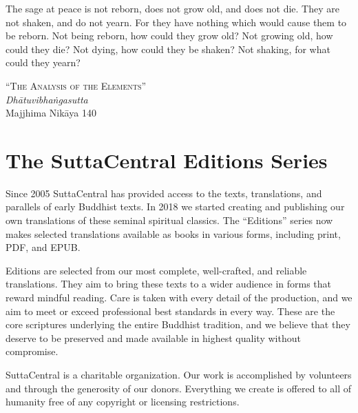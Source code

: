 \documentclass[12pt,openany]{book}%
\newcommand{\blankpage}{
\newpage
\thispagestyle{empty}
\mbox{}
\newpage
}
\newcommand*{\epigraphTranslatedTitle}[1]{\vspace*{.5em}\footnotesize\textsc{#1}\\}%
\newcommand*{\epigraphRootTitle}[1]{\footnotesize\textit{#1}\\}%
\newcommand*{\epigraphReference}[1]{\footnotesize{#1}}%
\begin{document}
\newpage

\setlength{\parindent}{1.5em}%
\newpage

\vspace*{\fill}

\begin{center}
\epigraph{The sage at peace is not reborn, does not grow old, and does not die. They are not shaken, and do not yearn. For they have nothing which would cause them to be reborn. Not being reborn, how could they grow old? Not growing old, how could they die? Not dying, how could they be shaken? Not shaking, for what could they yearn?}
{
\epigraphTranslatedTitle{“The Analysis of the Elements”}
\epigraphRootTitle{\textsanskrit{Dhātuvibhaṅgasutta}}
\epigraphReference{Majjhima \textsanskrit{Nikāya} 140}
}
\end{center}

\vspace*{2in}

\vspace*{\fill}

\blankpage%

\setlength{\parindent}{1em}
%
\tableofcontents
\newpage
\pagestyle{fancy}
%
\chapter*{The SuttaCentral Editions Series}

Since 2005 SuttaCentral has provided access to the texts, translations, and parallels of early Buddhist texts. In 2018 we started creating and publishing our own translations of these seminal spiritual classics. The “Editions” series now makes selected translations available as books in various forms, including print, PDF, and EPUB.

Editions are selected from our most complete, well-crafted, and reliable translations. They aim to bring these texts to a wider audience in forms that reward mindful reading. Care is taken with every detail of the production, and we aim to meet or exceed professional best standards in every way. These are the core scriptures underlying the entire Buddhist tradition, and we believe that they deserve to be preserved and made available in highest quality without compromise.

SuttaCentral is a charitable organization. Our work is accomplished by volunteers and through the generosity of our donors. Everything we create is offered to all of humanity free of any copyright or licensing restrictions. 
\end{document}

